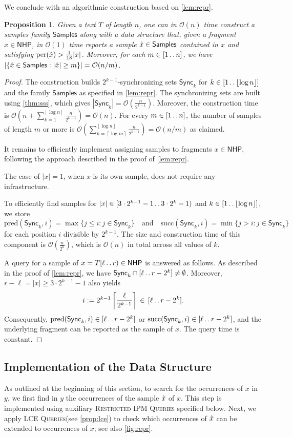 \documentclass[a4paper]{article}
\newtheorem{proposition}[theorem]{Proposition}
\theoremstyle{definition}
\theoremstyle{remark}
\newcommand{\RIPM}{\textsc{Restricted IPM Queries}\xspace}
\newcommand{\LCEQ}{\textsc{LCE Queries}\xspace}
\newcommand{\R}{\mathsf{Samples}}
\newcommand{\N}{\mathsf{NHP}}
\newcommand{\ceil}[1]{\left\lceil #1 \right\rceil}
\newcommand{\floor}[1]{\left\lfloor #1 \right\rfloor}
\newcommand{\dd}{\mathinner{\ldotp\ldotp}}
\DeclareMathOperator{\per}{per}
\newcommand{\pred}{\mathrm{pred}}
\newcommand{\suc}{\mathrm{succ}}
\newcommand{\Oh}{\mathcal{O}}
\renewcommand{\S}{\mathsf{Sync}}
\renewcommand{\S}{\mathsf{Sync}}
\begin{document}
We conclude with an algorithmic construction based on \cref{lem:repr}.
\begin{proposition}\label{prp:repr}
Given a text $T$ of length $n$, one can in $\Oh(n)$ time construct
a samples family $\R$ along with a data structure that,
given a fragment $x\in \N$,
  in $\Oh(1)$ time reports a sample $\rx\in \R$ contained in $x$ and satisfying $\per(\rx)>\frac{1}{18}|x|$.
Moreover, for each $m\in [1\dd n]$, we have $|\{\rx \in \R : |\rx|\ge m\}|=\Oh(n/m)$.
\end{proposition}
\begin{proof}
The construction builds $2^{k-1}$-synchronizing sets $\S_k$
for $k\in [1\dd \floor{\log n}]$ and the family $\R$ as specified in \cref{lem:repr}.
The synchronizing sets are built using \cref{thm:sss}, which gives $|\S_k| = \Oh(\frac{n}{2^{k-1}})$.
Moreover, the construction time is $\Oh(n + \sum_{k=1}^{\floor{\log n}}\frac{n}{2^{k-1}})=\Oh(n)$.
For every $m\in[1\dd n]$, the number of samples of length $m$ or more
is $\Oh(\sum_{k=\ceil{\log m}}^{\floor{\log n}}\frac{n}{2^{k-1}})=\Oh(n/m)$ as claimed.

It remains to efficiently implement assigning samples
to fragments $x\in \N$, following the approach described in the proof of \cref{lem:repr}.

The case of $|x|=1$, when $x$ is its own sample, does not require any infrastructure. 

To efficiently find samples for $|x|\in [3\cdot 2^{k-1}-1 \dd 3\cdot 2^k-1)$
and $k\in [1\dd \floor{\log n}]$, we
store \[\pred(\S_k,i)=\max\{j \le i : j\in \S_k\}\quad\text{and}\quad
\suc(\S_k,i)=\min\{j > i : j\in \S_k\}\] for each position $i$ divisible by $2^{k-1}$.
The size and construction time of this component is $\Oh(\frac{n}{2^k})$,
which is $\Oh(n)$ in total across all values of $k$.

A query for a sample of $x=T[\ell\dd r)\in \N$ is answered as follows. 
As described in the proof of \cref{lem:repr}, we have $\S_{k}\cap [\ell\dd r-2^{k}] \ne \emptyset$. 
Moreover, $r-\ell=|x|\ge 3\cdot 2^{k-1}-1$ also yields 
\[i:=2^{k-1}\ceil{\frac{\ell}{2^{k-1}}}\,\in\, [\ell\dd r-2^{k}].\]
Consequently, $\pred(\S_k,i)\in [\ell\dd r-2^{k}]$
or  $\suc(\S_k,i)\in [\ell\dd r-2^{k}]$, and the underlying fragment can be reported 
as the sample of $x$.
The query time is constant.
\end{proof}

\subsection{Implementation of the Data Structure}\label{sec:impl}
As outlined at the beginning of this section, to search for the occurrences of $x$ in $y$, we first find
in $y$ the  occurrences of the sample $\hat{x}$ of $x$.
This step is implemented using auxiliary \RIPM specified below.
Next, we apply \LCEQ (see \cref{prop:lce}) to check which occurrences of $\hat{x}$ can be extended to occurrences of $x$;
see also \cref{fig:repr}.
\end{document}
